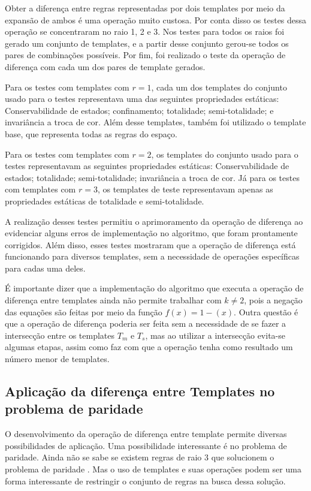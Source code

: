 Obter a diferença entre regras representadas por dois templates por meio da expansão de ambos é uma operação muito custosa. Por conta disso os testes dessa operação se concentraram no raio 1, 2 e 3. Nos testes para todos os raios foi gerado um conjunto de templates, e a partir desse conjunto gerou-se todos os pares de combinações possíveis. Por fim, foi realizado o teste da operação de diferença com cada um dos pares de template gerados.

Para os testes com templates com $r = 1$, cada um dos templates do conjunto usado para o testes representava uma das seguintes propriedades estáticas: Conservabilidade de estados; confinamento; totalidade; semi-totalidade; e invariância a troca de cor. Além desse templates, também foi utilizado o template base, que representa todas as regras do espaço.

Para os testes com templates com $r = 2$, os templates do conjunto usado para o testes representavam as seguintes propriedades estáticas: Conservabilidade de estados; totalidade; semi-totalidade; invariância a troca de cor. Já para os testes com templates com $r = 3$, os templates de teste representavam apenas as propriedades estáticas de totalidade e semi-totalidade.

A realização desses testes permitiu o aprimoramento da operação de diferença ao evidenciar alguns erros de implementação no algoritmo, que foram prontamente corrigidos. Além disso, esses testes mostraram que a operação de diferença está funcionando para diversos templates, sem a necessidade de operações específicas para cadas uma deles.

É importante dizer que a implementação do algoritmo que executa a operação de diferença entre templates ainda não permite trabalhar com $k\neq 2$, pois a negação das equações são feitas por meio da função $f(x) = 1 - (x)$. Outra questão é que a operação de diferença poderia ser feita sem a necessidade de se fazer a intersecção entre os templates $T_m$ e $T_s$, mas ao utilizar a intersecção evita-se algumas etapas, assim como faz com que a operação tenha como resultado um número menor de templates.

\subsection{Aplicação da diferença entre Templates no problema de paridade}
O desenvolvimento da operação de diferença entre template permite diversas possibilidades de aplicação.
Uma possibilidade interessante é no problema de paridade. 
Ainda não se sabe se existem regras de raio 3 que solucionem o problema de paridade \cite{Betel2013}. 
Mas o uso de templates e suas operações podem ser uma forma interessante de restringir o conjunto de regras na busca dessa solução.

